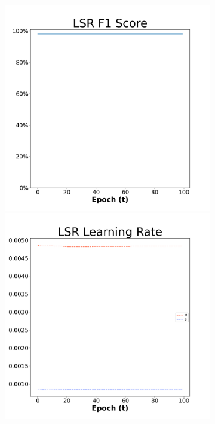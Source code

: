 \begin{figure}[H]
    \centering %
\begin{subfigure}{0.3\textwidth}
  \includegraphics[width=\linewidth]{images/exper2/breast/LSR_0.01_f1.png}
    \includegraphics[width=\linewidth]{images/exper2/breast/LSR_0.01_lr.png}

\end{subfigure}
\end{figure}
